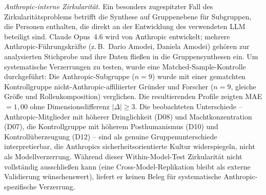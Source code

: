 \documentclass[12pt,a4paper]{article}
\begin{document}
\emph{Anthropic-interne Zirkularität.} Ein besonders zugespitzter Fall des Zirkularitätsproblems betrifft die Synthese auf Gruppenebene für Subgruppen, die Personen enthalten, die direkt an der Entwicklung des verwendeten LLM beteiligt sind. Claude Opus~4.6 wird von Anthropic entwickelt; mehrere Anthropic-Führungskräfte (z.\,B.\ Dario Amodei, Daniela Amodei) gehören zur analysierten Stichprobe und ihre Daten fließen in die Gruppensynthesen ein. Um systematische Verzerrungen zu testen, wurde eine Matched-Sample-Kontrolle durchgeführt: Die Anthropic-Subgruppe ($n = 9$) wurde mit einer gematchten Kontrollgruppe nicht-Anthropic-affiliierter Gründer und Forscher ($n = 9$, gleiche Größe und Rollenkomposition) verglichen. Die resultierenden Profile zeigten MAE $= 1{,}00$ ohne Dimensionsdifferenz $|\Delta| \geq 3$. Die beobachteten Unterschiede -- Anthropic-Mitglieder mit höherer Dringlichkeit (D08) und Machtkonzentration (D07), die Kontrollgruppe mit höherem Posthumanismus (D10) und Kontrollüberzeugung (D12) -- sind als genuine Gruppenunterschiede interpretierbar, die Anthropics sicherheitsorientierte Kultur widerspiegeln, nicht als Modellverzerrung. Während dieser Within-Model-Test Zirkularität nicht vollständig ausschließen kann (eine Cross-Model-Replikation bleibt als externe Validierung wünschenswert), liefert er keinen Beleg für systematische Anthropic-spezifische Verzerrung.
\end{document}
